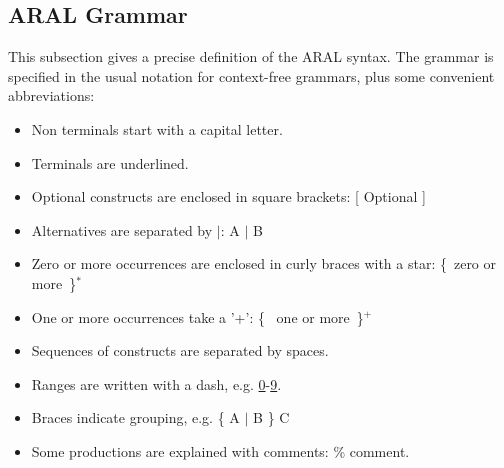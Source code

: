 \documentclass[a4paper,12pt]{report}
\begin{document}
\subsection{ARAL Grammar}

{
\newcommand{\regexstar}[1]{\{~#1~\}$^*$}
\newcommand{\regexplus}[1]{\{~#1~\}$^+$}
\newcommand{\regexgroup}[1]{\{~#1~\}}
\newcommand{\regexopt}[1]{[~#1~]}
\newcommand{\lexrange}[2]{\underline{#1}-\underline{#2}}
\newcommand{\lb}[0]{\underline{(}~}
\newcommand{\rb}[0]{\underline{)}}
\newcommand{\comma}[0]{\underline{,}~}
\newcommand{\garrow}[0]{$\rightarrow$}

\newenvironment{GRAMMAR}                          %
{
\begin{minipage}[t]{40ex}%
\prologcode\progfont%
\begin{quote}%
\begin{tabbing}%
\hspace{3ex}\=\hspace{3ex}\=\hspace{3ex}\=\hspace{3ex}%
\=\hspace{3ex}\=\hspace{4ex}\=\hspace{3ex}\=\hspace{3ex}\=\hspace{3ex}\=\hspace{3ex}\=\hspace{3ex}\=\hspace{3ex}\=\hspace{3ex}\kill}%
{\end{tabbing}%
\end{quote}%
\end{minipage}%
}

This subsection gives a precise definition of the ARAL syntax. The
grammar is specified in the usual notation for context-free grammars,
plus some convenient abbreviations:

\begin{itemize}
\item Non terminals start with a capital letter.
\item Terminals are underlined.
\item Optional constructs are enclosed in square brackets: [ Optional ]
\item Alternatives are separated by $\mid$: A $\mid$ B
\item Zero or more occurrences are enclosed in curly braces with a star: \regexstar{zero or more}
\item One or more occurrences take a '+': \regexplus{ one or more}
\item Sequences of constructs are separated by spaces.
\item Ranges are written with a dash, e.g. \underline{0}-\underline{9}.
\item Braces indicate grouping, e.g. \{ A $\mid$ B \} C
\item Some productions are explained with comments: \% comment.
\end{itemize}

}
\end{document}
